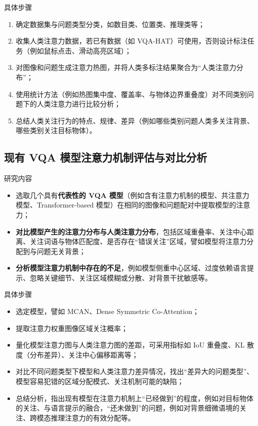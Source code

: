 \documentclass{beamer}
\begin{document}
\begin{frame}{具体步骤}
    \begin{enumerate}
        \item 确定数据集与问题类型分类，如数目类、位置类、推理类等；
        \item 收集人类注意力数据，若已有数据（如 VQA-HAT）可使用，否则设计标注任务（例如鼠标点击、滑动高亮区域）；
        \item 对图像和问题生成注意力热图，并将人类多标注结果聚合为“人类注意力分布”；
        \item 使用统计方法（例如热图集中度、覆盖率、与物体边界重叠度）对不同类别问题下的人类注意力进行比较分析；
        \item 总结人类关注行为的特点、规律、差异（例如哪些类别问题人类多关注背景、哪些类别关注目标物体）。
    \end{enumerate}
\end{frame}



\subsection{现有 VQA 模型注意力机制评估与对比分析}

\begin{frame}{研究内容}
    \begin{itemize}
        \item 选取几个具有\textcolor{deepred}{\textbf{代表性的 VQA 模型}}（例如含有注意力机制的模型、共注意力模型、Transformer-based 模型）在相同的图像和问题配对中提取模型的注意力；
        \item \textcolor{deepred}{\textbf{对比模型产生的注意力分布与人类注意力分布}}，包括区域重叠率、关注中心距离、关注词语与物体匹配度、是否存在“错误关注”区域，譬如模型将注意力分配到与问题无关背景；
        \item \textcolor{deepred}{\textbf{分析模型注意力机制中存在的不足}}，例如模型侧重中心区域、过度依赖语言提示、忽略关键细节、关注区域模糊或分散、对背景干扰敏感等。
    \end{itemize}
\end{frame}

\begin{frame}{具体步骤}
    \begin{itemize}
        \item 选定模型，譬如 MCAN、Dense Symmetric Co-Attention；
        \item 提取注意力权重图像区域关注概率；
        \item 量化模型注意力图与人类注意力图的差距，可采用指标如 IoU 重叠度、KL 散度（分布差异）、关注中心偏移距离等；
        \item 对比不同问题类型下模型和人类注意力差异情况，找出“差异大的问题类型”、模型容易犯错的区域分配模式、关注机制可能的缺陷；
        \item 总结分析，指出现有模型在注意力机制上“已经做到”的程度，例如对目标物体的关注、与语言提示的融合，“还未做到”的问题，例如对背景细微语境的关注、跨模态推理注意力的有效分配等。
    \end{itemize}
\end{frame}
\end{document}
